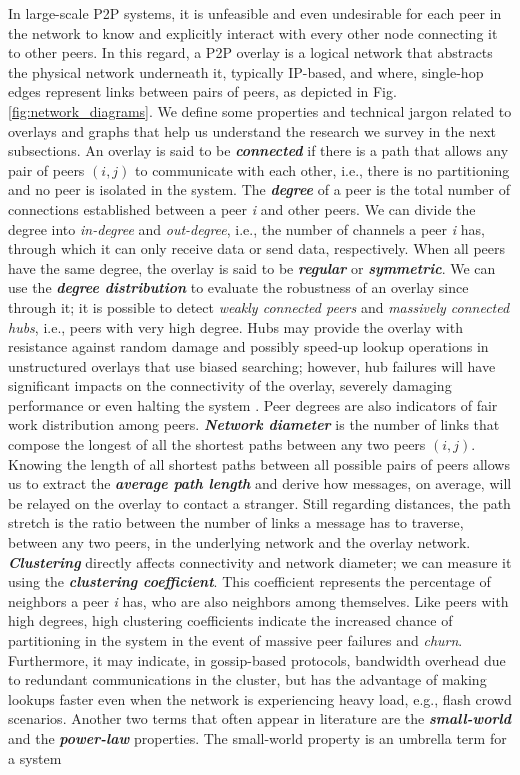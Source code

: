 \documentclass[runningheads]{llncs}
\begin{document}
In large-scale P2P systems, it is unfeasible and even undesirable for each peer in the network to know and explicitly interact with every other node connecting it to other peers. In this regard, a P2P overlay is a logical network that abstracts the physical network underneath it, typically IP-based, and where, single-hop edges represent links between pairs of peers, as depicted in Fig. \ref{fig:network_diagrams}. We define some properties and technical jargon related to overlays and graphs that help us understand the research we survey in the next subsections. An overlay is said to be \textbf{\textit{connected}} if there is a path that allows any pair of peers $(i, j)$ to communicate with each other, i.e., there is no partitioning and no peer is isolated in the system. The \textbf{\textit{degree}} of a peer is the total number of connections established between a peer \textit{i} and other peers. We can divide the degree into \textit{in-degree} and \textit{out-degree}, i.e., the number of channels a peer \textit{i} has, through which it can only receive data or send data, respectively. When all peers have the same degree, the overlay is said to be \textbf{\textit{regular}} or \textbf{\textit{symmetric}}. We can use the \textbf{\textit{degree distribution}} to evaluate the robustness of an overlay since through it; it is possible to detect \textit{weakly connected peers} and \textit{massively connected hubs}, i.e., peers with very high degree. Hubs may provide the overlay with resistance against random damage and possibly speed-up lookup operations in unstructured overlays that use biased searching; however, hub failures will have significant impacts on the connectivity of the overlay, severely damaging performance or even halting the system \cite{webdragons, controlling_the_hubs}. Peer degrees are also indicators of fair work distribution among peers. \textbf{\textit{Network diameter}} is the number of links that compose the longest of all the shortest paths between any two peers $(i, j)$. Knowing the length of all shortest paths between all possible pairs of peers allows us to extract the \textbf{\textit{average path length}} and derive how messages, on average, will be relayed on the overlay to contact a stranger. Still regarding distances, the path stretch is the ratio between the number of links a message has to traverse, between any two peers, in the underlying network and the overlay network. \textbf{\textit{Clustering}} directly affects connectivity and network diameter; we can measure it using the \textbf{\textit{clustering coefficient}}. This coefficient represents the percentage of neighbors a peer \textit{i} has, who are also neighbors among themselves. Like peers with high degrees, high clustering coefficients indicate the increased chance of partitioning in the system in the event of massive peer failures and \textit{churn}. Furthermore, it may indicate, in gossip-based protocols, bandwidth overhead due to redundant communications in the cluster, but has the advantage of making lookups faster even when the network is experiencing heavy load, e.g., flash crowd scenarios. Another two terms that often appear in literature are the \textbf{\textit{small-world}} and the \textbf{\textit{power-law}} properties. The small-world property is an umbrella term for a system 
\end{document}

